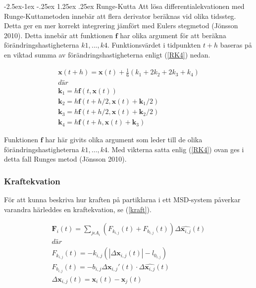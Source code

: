 \documentclass[a4paper,12pt,oneside,final,swedish]{extarticle}
\makeatletter
\renewcommand\paragraph{\@startsection{paragraph}{4}{\z@}%
            {-2.5ex\@plus -1ex \@minus -.25ex}%
            {1.25ex \@plus .25ex}%
            {\normalfont\normalsize\bfseries}}
\makeatother
\begin{document}
\paragraph{Runge-Kutta}%
Att lösa differentialekvationen med Runge-Kuttametoden innebär att flera derivator beräknas vid olika tidssteg. Detta ger en mer korrekt integrering jämfört med Eulers stegmetod (Jönsson 2010). Detta innebär att funktionen \begin{math}\mathbf f \end{math} har olika argument för att beräkna förändringshastigheterna $k1, ..., k4$. Funktionsvärdet i tidpunkten $t+h$ baseras på en viktad summa av förändringshastigheterna enligt (\ref{RK4}) nedan.

\begin{equation}
\begin{split}
\mathbf x(t+h)=\mathbf x(t)+\frac { 1 }{ 6 } ({ k }_{ 1 }+2{ k }_{ 2 }+2{ k }_{ 3 }+{ k }_{ 4 })
\\ där
\\ \mathbf{ k }_{ 1 }=h\mathbf f(t,\mathbf x(t))
\\ \mathbf{ k }_{ 2 }=h\mathbf f(t+h/2,\mathbf x(t)+\mathbf { k }_{ 1 }/2)
\\ \mathbf{ k }_{ 3 }=h\mathbf f(t+h/2,\mathbf x(t)+\mathbf{ k }_{ 2 }/2)
\\ \mathbf{ k }_{ 4 }=h\mathbf f(t+h,\mathbf x(t)+\mathbf{ k }_{ 3 })
\end{split}
\label{RK4}
\end{equation}

Funktionen \begin{math}\mathbf f \end{math} har här givits olika argument som leder till de olika förändringshastigheterna $k1, …, k4$. Med vikterna satta enlig (\ref{RK4}) ovan ges i detta fall Runges metod (Jönsson 2010).
\subsubsection{Kraftekvation}

För att kunna beskriva hur kraften på partiklarna i ett MSD-system påverkar varandra härleddes en kraftekvation, se (\ref{kraft}).

\begin{equation}
\begin{split}
{ \mathbf{ F }_{ i } }(t)=\sum _{ j\epsilon { A }_{ i } }{ ({ F }_{ { k }_{ i,j } }(t)+{ F }_{ { b }_{ i,j } }(t))\Delta \hat { \mathbf{ x }_{ i,j } } (t) }
\\ där
\\ { F }_{ { k }_{ i,j } }(t)=-{ k }_{ i,j }(\left| \Delta { \mathbf{ x }_{ i,j }(t) } \right| -l_{ { 0 }_{ i,j } })
\\ { F }_{ { b }_{ i,j } }(t)=-{ b }_{ i,j }\Delta { \mathbf{ x }_{ i,j }'(t)\cdot  }\Delta { \hat { \mathbf{ x }_{ i,j } } (t) }
\\ \Delta \mathbf{ x }_{ i,j }(t)=\mathbf{ x }_{ i }(t)-\mathbf{ x }_{ j }(t)
\end{split}
\label{kraft}
\end{equation}
\end{document}
